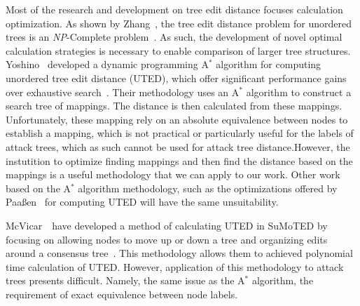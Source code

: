 Most of the research and development on tree edit distance focuses calculation optimization. As shown by Zhang~\etal, the tree edit distance problem for unordered trees is an \textit{NP}-Complete problem~\cite{zhang_editing_1992}. As such, the development of novel optimal calculation strategies is necessary to enable comparison of larger tree structures. Yoshino \etal\ developed a dynamic programming A$^*$ algorithm for computing unordered tree edit distance (UTED), which offer significant performance gains over exhaustive search~\cite{yoshino_dynamic_2013}. Their methodology uses an A$^*$ algorithm to construct a search tree of mappings. The distance is then calculated from these mappings. Unfortunately, these mapping rely on an absolute equivalence between nodes to establish a mapping, which is not practical or particularly useful for the labels of attack trees, which as such cannot be used for attack tree distance.However, the instutition to optimize finding mappings and then find the distance based on the mappings is a useful methodology that we can apply to our work. Other work based on the A$^*$ algorithm methodology, such as the optimizations offered by Paaßen~\cite{paasen_-algorithm_2021} for computing UTED will have the same unsuitability.

McVicar~\etal\ have developed a method of calculating UTED in SuMoTED by focusing on allowing nodes to move up or down a tree and organizing edits around a consensus tree~\cite{mcvicar_sumoted_2016}. This methodology allows them to achieved polynomial time calculation of UTED. However, application of this methodology to attack trees presents difficult. Namely, the same issue as the A$^*$ algorithm, the requirement of exact equivalence between node labels.


